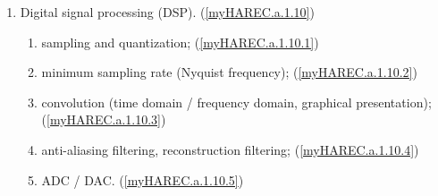 \begin{enumerate}
\begin{enumerate}[noitemsep]
\item Digital signal processing (DSP). (\ref{myHAREC.a.1.10})\label{HAREC.a.1.10}
\begin{enumerate}[noitemsep]
\item sampling and quantization; (\ref{myHAREC.a.1.10.1})\label{HAREC.a.1.10.1}
\item minimum sampling rate (Nyquist frequency); (\ref{myHAREC.a.1.10.2})\label{HAREC.a.1.10.2}
\item convolution (time domain / frequency domain, graphical presentation); (\ref{myHAREC.a.1.10.3})\label{HAREC.a.1.10.3}
\item anti-aliasing filtering, reconstruction filtering; (\ref{myHAREC.a.1.10.4})\label{HAREC.a.1.10.4}
\item ADC / DAC. (\ref{myHAREC.a.1.10.5})\label{HAREC.a.1.10.5}
\end{enumerate}

\end{enumerate}


\end{enumerate}
